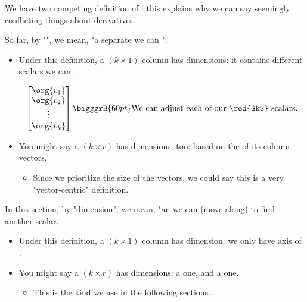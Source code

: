         \begin{clarification}
            We have two competing definition of : this explains why we can say seemingly conflicting things about derivatives.
            
            \boxdiv
            
            So far, by "", we mean, "a separate  we can ".
            
            \begin{itemize}
                \item Under this definition, a $(k \times 1)$ column  has  dimensions: it contains  different scalars we can .
                
                \begin{equation*}
                    \begin{bmatrix}
                        \org{v_1} \\ \org{v_2} \\ \vdots \\ \org{v_k}  
                    \end{bmatrix}
                    \bigggrB{60pt} \text{We can adjust each of our \red{$k$} scalars.}
                \end{equation*}
                
                \item You might say a $(k \times r)$  has  dimensions, too: based on the  of its column vectors.
                    \begin{itemize}
                        \item Since we prioritize the size of the vectors, we could say this is a very "vector-centric" definition.
                    \end{itemize}
            \end{itemize}
            
            \boxdiv
            
            In this section, by "dimension", we mean, "an  we can  (move along) to find another scalar.
            
            \begin{itemize}
                \item Under this definition, a $(k \times 1)$ column  has  dimension: we only have  axis of .
                
                \item You might say a $(k \times r)$  has  dimensions: a  one, and a  one.
                    \begin{itemize}
                        \item This  is the kind we use in the following sections.
                    \end{itemize}
            \end{itemize}
        \end{clarification}
        
